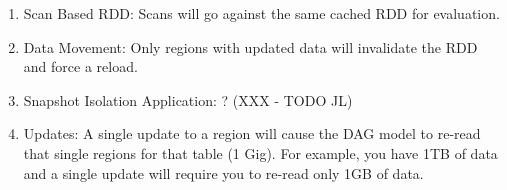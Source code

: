 \begin{enumerate}
	\item Scan Based RDD: Scans will go against the same cached RDD for evaluation.
	\item Data Movement: Only regions with updated data will invalidate the RDD and
	force a reload.
	\item Snapshot Isolation Application: ? (XXX - TODO JL)
	\item Updates:  A single update to a region will cause the DAG model to re-read
	that single regions for that table (1 Gig).  For example, you have 1TB of data
	and a single update will require you to re-read only 1GB of data.
\end{enumerate}
        

